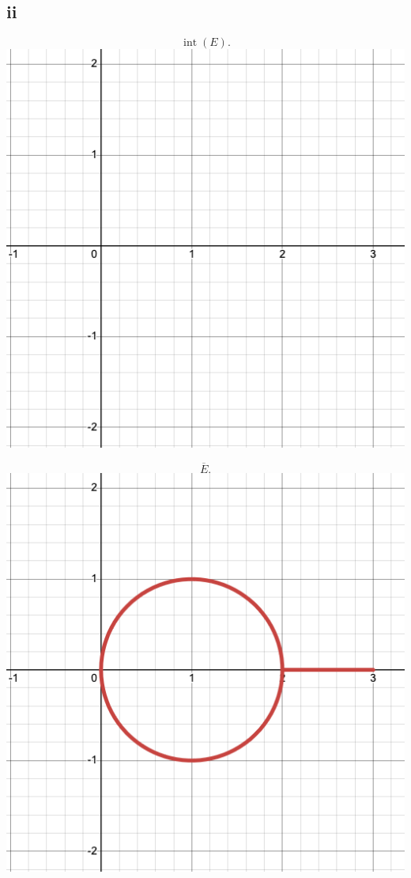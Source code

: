 \documentclass{eeleyes}
\newcommand\conj[1]{\overline{#1}}
\DeclareMathOperator{\interior}{int}
\begin{document}
\subsection*{ii}
\begin{multicols}{3}
\begin{center}
    \[
        \interior(E)
    .\]
    \includegraphics[width=0.8\linewidth]{figures/ii_img-1.png}
\end{center}

\columnbreak

\begin{center}
    \[
        \conj{E}
    .\]
    \includegraphics[width=0.8\linewidth]{figures/ii_img-3.png}
\end{center}


\end{multicols}
\end{document}
